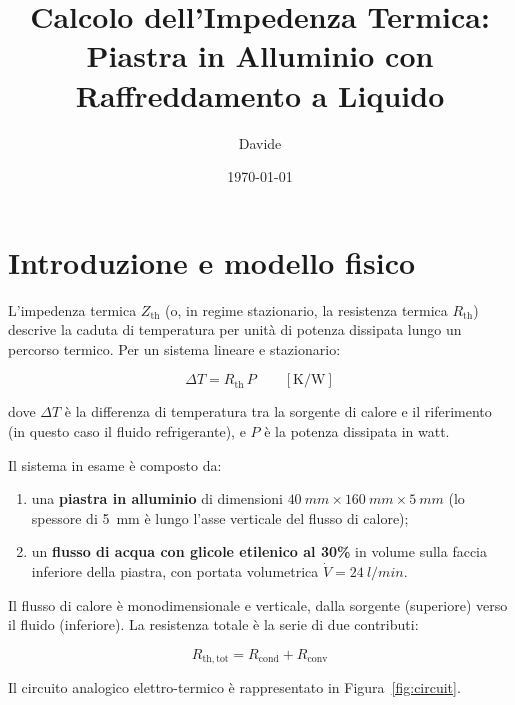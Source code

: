 \documentclass[a4paper,11pt]{article}
\title{\textbf{Calcolo dell'Impedenza Termica:\\
Piastra in Alluminio con Raffreddamento a Liquido}}
\author{Davide}
\date{\today}
\begin{document}
\maketitle
\tableofcontents
\bigskip

\section{Introduzione e modello fisico}

L'impedenza termica $Z_{\mathrm{th}}$ (o, in regime stazionario, la resistenza termica
$R_{\mathrm{th}}$) descrive la caduta di temperatura per unità di potenza dissipata lungo
un percorso termico. Per un sistema lineare e stazionario:

\begin{equation}
  \Delta T = R_{\mathrm{th}}\, P
  \qquad\left[\si{\kelvin\per\watt}\right]
\end{equation}

dove $\Delta T$ è la differenza di temperatura tra la sorgente di calore e il riferimento
(in questo caso il fluido refrigerante), e $P$ è la potenza dissipata in watt.

Il sistema in esame è composto da:
\begin{enumerate}
  \item una \textbf{piastra in alluminio} di dimensioni
        $\SI{40}{mm}\times\SI{160}{mm}\times\SI{5}{mm}$
        (lo spessore di \SI{5}{mm} è lungo l'asse verticale del flusso di calore);
  \item un \textbf{flusso di acqua con glicole etilenico al 30\%} in volume
        sulla faccia inferiore della piastra, con portata volumetrica
        $\dot{V}=\SI{24}{l/min}$.
\end{enumerate}

Il flusso di calore è monodimensionale e verticale, dalla sorgente (superiore)
verso il fluido (inferiore). La resistenza totale è la serie di due contributi:

\begin{equation}
  \boxed{R_{\mathrm{th,tot}} = R_{\mathrm{cond}} + R_{\mathrm{conv}}}
\end{equation}

Il circuito analogico elettro-termico è rappresentato in Figura~\ref{fig:circuit}.
\end{document}

